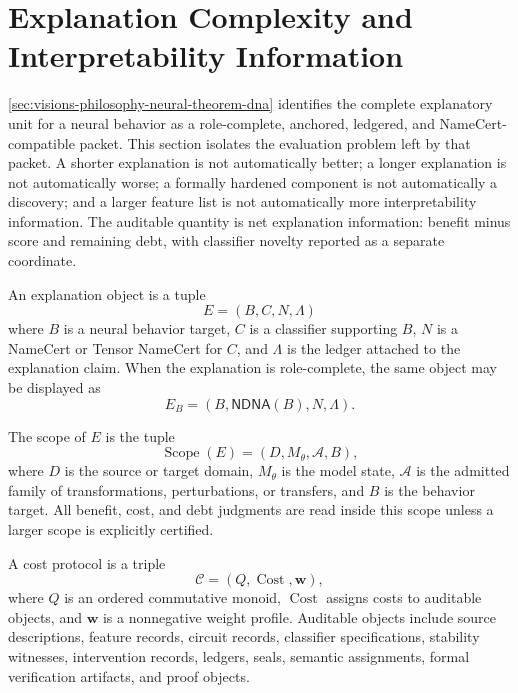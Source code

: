 \section{Explanation Complexity and Interpretability Information}
\label{sec:visions-philosophy-explanation-complexity-information}

\autoref{sec:visions-philosophy-neural-theorem-dna} identifies the
complete explanatory unit for a neural behavior as a role-complete,
anchored, ledgered, and NameCert-compatible packet. This section isolates
the evaluation problem left by that packet. A shorter explanation is not
automatically better; a longer explanation is not automatically worse; a
formally hardened component is not automatically a discovery; and a
larger feature list is not automatically more interpretability
information. The auditable quantity is net explanation information:
benefit minus score and remaining debt, with classifier novelty reported
as a separate coordinate.

\begin{definition}
\label{def:philosophy-explanation-object}
An explanation object is a tuple
$$
E=(B,C,N,\Lambda)
$$
where $B$ is a neural behavior target, $C$ is a classifier supporting
$B$, $N$ is a NameCert or Tensor NameCert for $C$, and $\Lambda$ is the
ledger attached to the explanation claim. When the explanation is
role-complete, the same object may be displayed as
$$
E_B=(B,\mathsf{NDNA}(B),N,\Lambda).
$$
\end{definition}

\begin{definition}
\label{def:philosophy-explanation-scope}
The scope of $E$ is the tuple
$$
\operatorname{Scope}(E)
=
(D,M_{\theta},\mathcal A,B),
$$
where $D$ is the source or target domain, $M_{\theta}$ is the model
state, $\mathcal A$ is the admitted family of transformations,
perturbations, or transfers, and $B$ is the behavior target. All benefit,
cost, and debt judgments are read inside this scope unless a larger
scope is explicitly certified.
\end{definition}

\begin{definition}
\label{def:philosophy-explanation-cost-protocol}
A cost protocol is a triple
$$
\mathcal C=(Q,\operatorname{Cost},\mathbf w),
$$
where $Q$ is an ordered commutative monoid, $\operatorname{Cost}$ assigns
costs to auditable objects, and $\mathbf w$ is a nonnegative weight
profile. Auditable objects include source descriptions, feature records,
circuit records, classifier specifications, stability witnesses,
intervention records, ledgers, seals, semantic assignments, formal
verification artifacts, and proof objects.
\end{definition}

